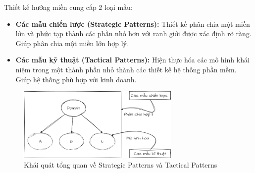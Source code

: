 Thiết kế hướng miền cung cấp 2 loại mẫu:

\begin{itemize}

\item \textbf{Các mẫu chiến lược (Strategic Patterns):} Thiết kế phân chia một miền lớn và phức tạp thành các phần nhỏ hơn với ranh giới được xác định rõ ràng. Giúp phân chia một miền lớn hợp lý.

\item \textbf{Các mẫu kỹ thuật (Tactical Patterns):} Hiện thực hóa các mô hình khái niệm trong một thành phần nhỏ thành các thiết kế hệ thống phần mềm. Giúp hệ thống phù hợp với kinh doanh.

\end{itemize}

\begin{figure}[H]

\centering

\includegraphics[width = 0.7\textwidth]{pictures/StrategicPatternsVATacticalPatterns/main.drawio.png}

\caption{Khái quát tổng quan về Strategic Patterns và Tactical Patterns}

\end{figure}

